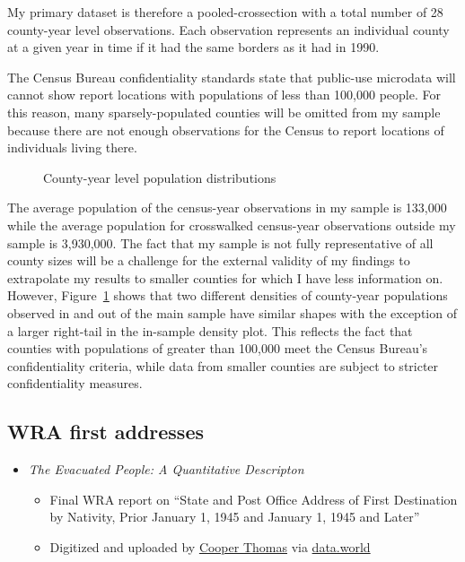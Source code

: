 \documentclass[12pt]{article}
\begin{document}
My primary dataset is therefore a pooled-crossection with a total number
of 28 county-year level observations. Each observation represents an
individual county at a given year in time if it had the same borders as
it had in 1990.

The Census Bureau confidentiality standards state that public-use
microdata will cannot show report locations with populations of less
than 100,000 people. For this reason, many sparsely-populated counties
will be omitted from my sample because there are not enough observations
for the Census to report locations of individuals living there.

\label{cell-fig-comparesamplepops}
\begin{figure}[H]
\centering{
}
\caption{\label{fig-comparesamplepops}County-year level population
distributions}
\end{figure}%

The average population of the census-year observations in my sample is
133,000 while the average population for
crosswalked census-year observations outside my sample is
3,930,000. The fact that my sample is not
fully representative of all county sizes will be a challenge for the
external validity of my findings to extrapolate my results to smaller
counties for which I have less information on. However,
Figure~\ref{fig-comparesamplepops} shows that two different densities of
county-year populations observed in and out of the main sample have
similar shapes with the exception of a larger right-tail in the
in-sample density plot. This reflects the fact that counties with
populations of greater than 100,000 meet the Census Bureau's
confidentiality criteria, while data from smaller counties are subject
to stricter confidentiality measures.

\subsection{WRA first addresses}\label{wra-first-addresses}

\begin{itemize}

\item
  {\emph{The Evacuated People: A Quantitative Descripton}}
  \cite{krug_evacuated_1946}

  \begin{itemize}
  
  \item
    Final WRA report on ``State and Post Office Address of First
    Destination by Nativity, Prior January 1, 1945 and January 1, 1945
    and Later''
  \item
    Digitized and uploaded by \href{https://cooper-thomas.com/}{Cooper Thomas} 
    via \href{https://data.world/infinitecoop/japanese-internment-camps}{data.world}
  \end{itemize}
\end{itemize}
\end{document}
